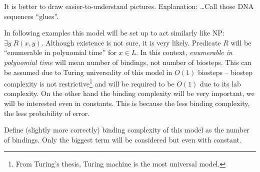 
It is better to draw easier-to-understand pictures. Explanation: \ldots Call those DNA sequences ``glues''.

In following examples this model will be set up to act similarly like NP: $\exists y \; R(x,y)$. Although existence is not sure, it is very likely. Predicate $R$ will be ``enumerable in polynomial time'' for $x \in L$. In this context, {\em enumerable in polynomial time} will mean number of bindings, not number of biosteps. This can be assumed due to Turing universality of this model in $O(1)$ biosteps -- biostep complexity is not restrictive\footnote{From Turing's thesis, Turing machine is the most universal model.} and will be required to be $O(1)$ due to its lab complexity. On the other hand the binding complexity will be very important, we will be interested even in constants. This is because the less binding complexity, the less probability of error.


Define (slightly more correctly) binding complexity of this model as the number of bindings. Only the biggest term will be considered but even with constant.

